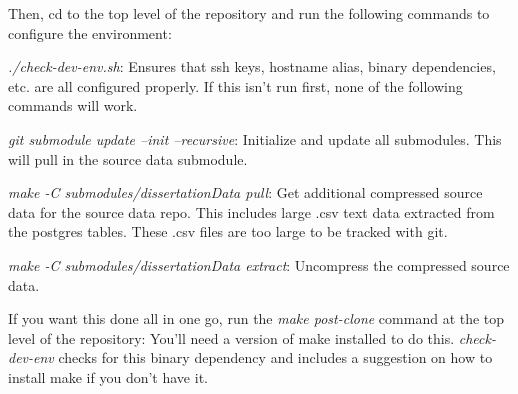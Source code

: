 \documentclass[man,floatsintext,donotrepeattitle]{apa6}
\begin{document}
Then, cd to the top level of the repository and run the following commands to configure the environment:

\begin{singlespace}
\begin{compactitem} 
  \item \emph{./check-dev-env.sh}:
    Ensures that ssh keys, hostname alias, binary dependencies, etc. are all configured properly.
    If this isn't run first, none of the following commands will work.
  \item \emph{git submodule update --init --recursive}:
    Initialize and update all submodules.
    This will pull in the source data submodule.
  \item \emph{make -C submodules/dissertationData pull}:
    Get additional compressed source data for the source data repo.
    This includes large .csv text data extracted from the postgres tables.
    These .csv files are too large to be tracked with git.
  \item \emph{make -C submodules/dissertationData extract}:
    Uncompress the compressed source data.
\end{compactitem}
\end{singlespace}

If you want this done all in one go, run the \emph{make post-clone} command at the top level of the repository:
You'll need a version of make installed to do this.
\emph{check-dev-env} checks for this binary dependency and includes a suggestion on how to install make if you don't have it.
\end{document}
